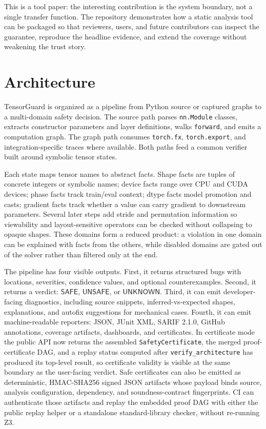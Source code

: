 \documentclass[11pt]{article}
\newcommand{\tg}{TensorGuard}
\newcommand{\unknown}{\ensuremath{\mathsf{UNKNOWN}}}
\newcommand{\safe}{\ensuremath{\mathsf{SAFE}}}
\newcommand{\unsafe}{\ensuremath{\mathsf{UNSAFE}}}
\begin{document}
This is a tool paper: the interesting contribution is the system boundary,
not a single transfer function.  The repository demonstrates how a static
analysis tool can be packaged so that reviewers, users, and future contributors
can inspect the guarantee, reproduce the headline evidence, and extend the
coverage without weakening the trust story.

\section{Architecture}

\tg{} is organized as a pipeline from Python source or captured graphs to a
multi-domain safety decision.  The source path parses \texttt{nn.Module}
classes, extracts constructor parameters and layer definitions, walks
\texttt{forward}, and emits a computation graph.  The graph path consumes
\texttt{torch.fx}, \texttt{torch.export}, and integration-specific traces where
available.  Both paths feed a common verifier built around symbolic tensor
states.

Each state maps tensor names to abstract facts.  Shape facts are tuples of
concrete integers or symbolic names; device facts range over CPU and CUDA
devices; phase facts track train/eval context; dtype facts model promotion and
casts; gradient facts track whether a value can carry gradient to downstream
parameters.  Several later steps add stride and permutation information so
viewability and layout-sensitive operators can be checked without collapsing
to opaque shapes.  These domains form a reduced product: a violation in one
domain can be explained with facts from the others, while disabled domains are
gated out of the solver rather than filtered only at the end.

The pipeline has four visible outputs.  First, it returns structured bugs with
locations, severities, confidence values, and optional counterexamples.  Second,
it returns a verdict: \safe{}, \unsafe{}, or \unknown{}.  Third, it can emit
developer-facing diagnostics, including source snippets, inferred-vs-expected
shapes, explanations, and autofix suggestions for mechanical cases.  Fourth,
it can emit machine-readable reporters: JSON, JUnit XML, SARIF 2.1.0, GitHub
annotations, coverage artifacts, dashboards, and certificates.  In certificate
mode the public API now returns the assembled \texttt{SafetyCertificate}, the
merged proof-certificate DAG, and a replay status computed after
\texttt{verify\_architecture} has produced its top-level result, so certificate
validity is visible at the same boundary as the user-facing verdict.  Safe
certificates can also be emitted as deterministic, HMAC-SHA256 signed JSON
artifacts whose payload binds source, analysis configuration, dependency, and
soundness-contract fingerprints.  CI can authenticate those artifacts and replay
the embedded proof DAG with either the public replay helper or a standalone
standard-library checker, without re-running Z3.
\end{document}
